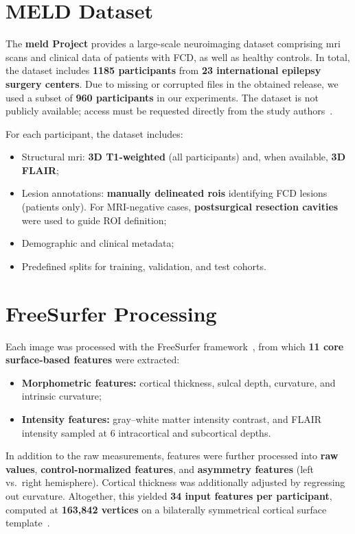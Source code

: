 \documentclass[FCD_GNN.tex]{subfiles}
\begin{document}
\section{MELD Dataset}
The \textbf{\ac{meld} Project} provides a large-scale neuroimaging dataset comprising \ac{mri} scans and clinical data of patients with FCD, as well as healthy controls. 
In total, the dataset includes \textbf{1185 participants} from \textbf{23 international epilepsy surgery centers}. 
Due to missing or corrupted files in the obtained release, we used a subset of \textbf{960 participants} in our experiments. 
The dataset is not publicly available; access must be requested directly from the study authors~\cite{Ripart2025MELD}.

For each participant, the dataset includes:
\begin{itemize}
    \item Structural \ac{mri}: \textbf{3D T1-weighted} (all participants) and, when available, \textbf{3D FLAIR};
    \item Lesion annotations: \textbf{manually delineated \acp{roi}} identifying FCD lesions (patients only). For MRI-negative cases, \textbf{postsurgical resection cavities} were used to guide ROI definition;
    \item Demographic and clinical metadata;
    \item Predefined splits for training, validation, and test cohorts.
\end{itemize}

\section{FreeSurfer Processing}
Each image was processed with the FreeSurfer framework~\cite{Fischl2012FreeSurfer}, from which \textbf{11 core surface-based features} were extracted:
\begin{itemize}
    \item \textbf{Morphometric features:} cortical thickness, sulcal depth, curvature, and intrinsic curvature;
    \item \textbf{Intensity features:} gray–white matter intensity contrast, and FLAIR intensity sampled at 6 intracortical and subcortical depths.
\end{itemize}

In addition to the raw measurements, features were further processed into 
\textbf{raw values}, \textbf{control-normalized features}, and \textbf{asymmetry features} 
(left vs.~right hemisphere). Cortical thickness was additionally adjusted by regressing out curvature. 
Altogether, this yielded \textbf{34 input features per participant}, computed at \textbf{163{,}842 vertices} 
on a bilaterally symmetrical cortical surface template~\cite{Ripart2025MELD}.
\end{document}
